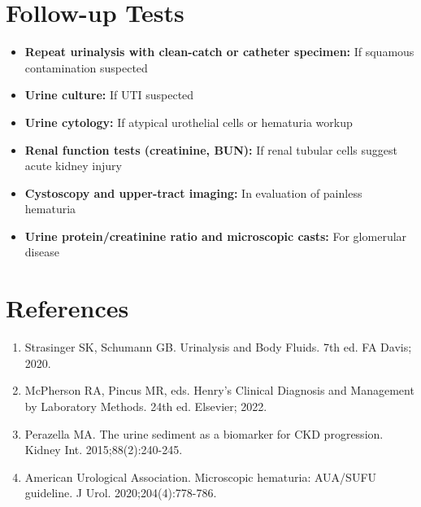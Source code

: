 \section*{Follow-up Tests}
\begin{itemize}
  \item \textbf{Repeat urinalysis with clean-catch or catheter specimen:} If squamous contamination suspected
  \item \textbf{Urine culture:} If UTI suspected
  \item \textbf{Urine cytology:} If atypical urothelial cells or hematuria workup
  \item \textbf{Renal function tests (creatinine, BUN):} If renal tubular cells suggest acute kidney injury
  \item \textbf{Cystoscopy and upper-tract imaging:} In evaluation of painless hematuria
  \item \textbf{Urine protein/creatinine ratio and microscopic casts:} For glomerular disease
\end{itemize}

\section*{References}
\begin{enumerate}
  \item Strasinger SK, Schumann GB. Urinalysis and Body Fluids. 7th ed. FA Davis; 2020.
  \item McPherson RA, Pincus MR, eds. Henry's Clinical Diagnosis and Management by Laboratory Methods. 24th ed. Elsevier; 2022.
  \item Perazella MA. The urine sediment as a biomarker for CKD progression. Kidney Int. 2015;88(2):240-245.
  \item American Urological Association. Microscopic hematuria: AUA/SUFU guideline. J Urol. 2020;204(4):778-786.
\end{enumerate}

\clearpage